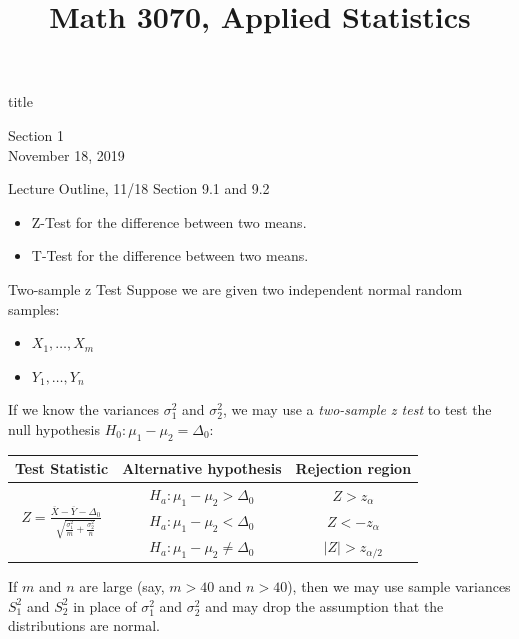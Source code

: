 \documentclass[t,handout]{beamer}
\title{Math 3070, Applied Statistics}
\newcommand{\nl}[1]{\vspace{#1 em}}
\begin{document}
\begin{frame}[c]
    \begin{beamercolorbox}[rounded=true,wd=\textwidth,center]{title}
        \inserttitle
    \end{beamercolorbox}
    \begin{center}
        Section 1\\
        \nl{0.5}
        November 18, 2019
    \end{center}
\end{frame}
\begin{frame}[c]{Lecture Outline, 11/18}
    Section 9.1 and 9.2
    \begin{itemize}
        \item Z-Test for the difference between two means.
        \item T-Test for the difference between two means.
    \end{itemize}
\end{frame}

\begin{frame}{Two-sample z Test}
    Suppose we are given two independent normal random samples:
    \begin{itemize}
    \item $X_1,\dots,X_m$
    \item $Y_1,\dots,Y_n$
    \end{itemize}
    \pause If we know the variances $\sigma_1^2$ and $\sigma_2^2$, we may use a \emph{two-sample z test} to test the null hypothesis $H_0: \mu_1-\mu_2 = \Delta_0$:
    
    \pause\begin{block}{}
    \begin{tabular}{c|c|c}
    Test Statistic & Alternative hypothesis & Rejection region \\ \hline
    \multirow{3}{*}{$\displaystyle Z=\frac{\overline X-\overline Y-\Delta_0}{\sqrt{\frac{\sigma_1^2}m+\frac{\sigma_2^2}n}}$} & $H_a: \mu_1-\mu_2>\Delta_0$ & $Z>z_{\alpha}$ \\
    & $H_a: \mu_1-\mu_2<\Delta_0$ & $Z<-z_{\alpha}$ \\
    & $H_a: \mu_1-\mu_2\neq\Delta_0$ & $|Z|>z_{\alpha/2}$\\
    \end{tabular}
    \end{block}
    
    \pause If $m$ and $n$ are large (say, $m>40$ and $n>40$), then we may use sample variances $S_1^2$ and $S_2^2$ in place of $\sigma_1^2$ and $\sigma_2^2$ and may drop the assumption that the distributions are normal.
    \end{frame}
    
\end{document}
